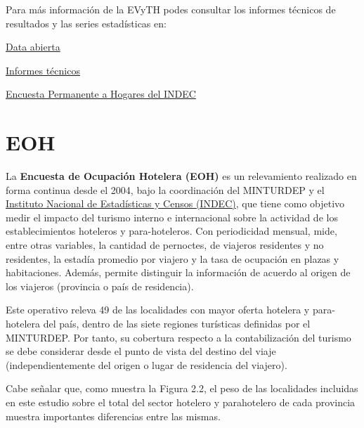 \documentclass[
  openany]{book}
\begin{document}
Para más información de la EVyTH podes consultar los informes técnicos de resultados y las series estadísticas en:

\href{http://datos.yvera.gob.ar/dataset/encuesta-viajes-turismo-hogares-evyth}{Data abierta}

\href{https://www.yvera.tur.ar/estadistica/informe/info/encuesta-de-viajes-y-turismo-de-los-hogares-evyth}{Informes técnicos}

\href{https://www.indec.gob.ar/indec/web/Institucional-Indec-OperacionesEstadisticas}{Encuesta Permanente a Hogares del INDEC}

\hypertarget{eoh}{%
\section{EOH}\label{eoh}}

La \textbf{Encuesta de Ocupación Hotelera (EOH)} es un relevamiento realizado en forma continua desde el 2004, bajo la coordinación del MINTURDEP y el \href{https://www.indec.gob.ar/indec/web/Nivel4-Tema-3-13-56}{Instituto Nacional de Estadísticas y Censos (INDEC)}, que tiene como objetivo medir el impacto del turismo interno e internacional sobre la actividad de los establecimientos hoteleros y para-hoteleros.
Con periodicidad mensual, mide, entre otras variables, la cantidad de pernoctes, de viajeros residentes y no residentes, la estadía promedio por viajero y la tasa de ocupación en plazas y habitaciones.
Además, permite distinguir la información de acuerdo al origen de los viajeros (provincia o país de residencia).

Este operativo releva 49 de las localidades con mayor oferta hotelera y para-hotelera del país, dentro de las siete regiones turísticas definidas por el MINTURDEP.
Por tanto, su cobertura respecto a la contabilización del turismo se debe considerar desde el punto de vista del destino del viaje (independientemente del origen o lugar de residencia del viajero).

Cabe señalar que, como muestra la Figura 2.2, el peso de las localidades incluidas en este estudio sobre el total del sector hotelero y parahotelero de cada provincia muestra importantes diferencias entre las mismas.
\end{document}

